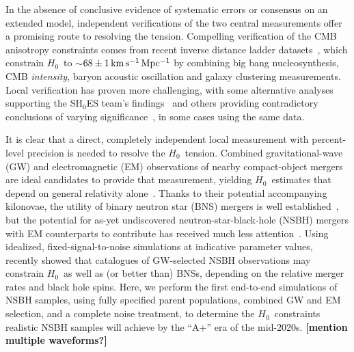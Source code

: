 \documentclass[%
 reprint,
 superscriptaddress,
 nofootinbib,
 amsmath,amssymb,
 aps,
]{revtex4-2}
\newcommand{\hubble}{\ensuremath{H_0}}
\newcommand{\kmsmpc}{\ensuremath{{\rm km\,s^{-1}\,Mpc^{-1}}}}
\begin{document}
In the absence of conclusive evidence of systematic errors or consensus on an extended model, independent verifications of the two central measurements offer a promising route to resolving the tension. Compelling verification of the CMB anisotropy constraints comes from recent inverse distance ladder datasets~\cite{Addison_etal:2017,DES_H_0:2017,Philcox_etal:2020}, which constrain \hubble\ to $\sim$$68 \pm 1\,\kmsmpc$ by combining big bang nucleosynthesis, CMB {\it intensity}, baryon acoustic oscillation and galaxy clustering measurements. Local verification has proven more challenging, with some alternative analyses supporting the SH$_0$ES team's findings~\cite{Yuan_etal:2019,Huang_etal:2020,H0LICOW_XIII:2020,TDCOSMO_I:2020,Pesce_etal:2020} and others providing contradictory conclusions of varying significance~\cite{Freedman_etal:2019,Freedman_etal:2020,TDCOSMO_IV:2020,Boruah_etal:2020}, in some cases using the same data.

It is clear that a direct, completely independent local measurement with percent-level precision is needed to resolve the \hubble\ tension. Combined gravitational-wave (GW) and electromagnetic (EM) observations of nearby compact-object mergers are ideal candidates to provide that measurement, yielding \hubble\ estimates that depend on general relativity alone~\cite{Schutz:1986,Holz_Hughes:2005,Dalal:2006,Nissanke_etal:2010,Taylor_etal:2012,Messenger_Read:2012,Nissanke_etal:2013,Oguri:2016,delPozzo:2017,Abbott_etal:2017a,Seto:2018,Chen_etal:2018,Fishbach_etal:2018,Feeney_etal:2018,Mortlock_etal:2019,Soares-Santos_etal:2019,Gray_etal:2019,Palmese_etal:2020,Vasylyev_Filippenko:2020,Chen_etal:2020,Gayathri_etal:2020,Mukherjee_etal:2020}. Thanks to their potential accompanying kilonovae, the utility of binary neutron star (BNS) mergers is well established~\cite{Dalal:2006,Nissanke_etal:2010,Taylor_etal:2012,Messenger_Read:2012,Nissanke_etal:2013,Oguri:2016,delPozzo:2017,Abbott_etal:2017a,Seto:2018,Chen_etal:2018,Fishbach_etal:2018,Feeney_etal:2018,Mortlock_etal:2019,Gray_etal:2019}, but the potential for as-yet undiscovered neutron-star-black-hole (NSBH) mergers with EM counterparts to contribute has received much less attention~\cite{Nissanke_etal:2010,Nissanke_etal:2013,Vitale_Chen:2018}. Using idealized, fixed-signal-to-noise simulations at indicative parameter values,~\citet{Vitale_Chen:2018} recently showed that catalogues of GW-selected NSBH observations may constrain \hubble\ as well as (or better than) BNSs, depending on the relative merger rates and black hole spins. Here, we perform the first end-to-end simulations of NSBH samples, using fully specified parent populations, combined GW and EM selection, and a complete noise treatment, to determine the \hubble\ constraints realistic NSBH samples will achieve by the ``A+'' era of the mid-2020s. {\bf [mention multiple waveforms?]}
\end{document}
